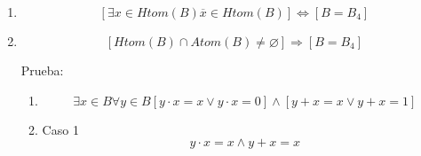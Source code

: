 \begin{enumerate}
\begin{enumerate}
\begin{enumerate}
\begin{enumerate}
        \[\vee \left\lbrack {{{\left\lbrack {x\mathsf{\mathit{maximal}}\overline{y}} \right\rbrack \land \left\lbrack {\overline{x}\mathsf{\mathit{maximal}}y} \right\rbrack} \land \left\lbrack {\neg{({x\mathsf{\mathit{maximal}}y})}} \right\rbrack} \land \left\lbrack {\neg{({\overline{x}\mathsf{\mathit{maximal}}\overline{y}})}} \right\rbrack} \right\rbrack\]
      \item
        Pongamos sin pérdida de generalidad

        \[\forall{{\{{y,\overline{y}}\}} \subset B_{\ast}^{\ast}}\]

        \[\left\lbrack {{{\left\lbrack {x\mathsf{\mathit{maximal}}y} \right\rbrack \land \left\lbrack {\overline{x}\mathsf{\mathit{maximal}}\overline{y}} \right\rbrack} \land \left\lbrack {\neg{({x\mathsf{\mathit{maximal}}\overline{y}})}} \right\rbrack} \land \left\lbrack {\neg{({\overline{x}\mathsf{\mathit{maximal}}y})}} \right\rbrack} \right\rbrack \land\]

        \[\land \left\lbrack {{{\left\lbrack {x\mathsf{\mathit{maximal}}y} \right\rbrack \land \left\lbrack {\overline{x}\mathsf{\mathit{maximal}}\overline{y}} \right\rbrack} \land \left\lbrack {\neg{({x\mathsf{\mathit{maximal}}\overline{y}})}} \right\rbrack} \land \left\lbrack {\neg{({\overline{x}\mathsf{\mathit{maximal}}y})}} \right\rbrack} \right\rbrack\]
      \item
        \[\forall{{\{{y,\overline{y}}\}} \subset B_{\ast}^{\ast}}{{{y + \overline{x}} = {{1 \land y} \cdot \overline{x}}} = 0}\]
      \item
        \[\forall{{\{{y,\overline{y}}\}} \subset B_{\ast}^{\ast}}{{y = {x \land \overline{y}}} = \overline{x}}\]
      \item
        \[{B_{\ast}^{\ast} = {{\{ 1,0\}} \cup \mathit{Htom}}}{{{(B)} = {\{{1,0,x,\overline{x}}\}}} = B_{4}}\]
      \end{enumerate}
    \item
      \[\left\lbrack {\exists{x \in \mathit{Htom}}{(B)}{\overline{x} \in \mathit{Htom}}{(B)}} \right\rbrack\Leftrightarrow\left\lbrack {B = B_{4}} \right\rbrack\]
    \item
      \[\left\lbrack {\mathit{Htom}{{(B)} \cap \mathit{Atom}}{{(B)} \neq \varnothing}} \right\rbrack\Rightarrow\left\lbrack {B = B_{4}} \right\rbrack\]

      Prueba:

      \begin{enumerate}
      \def\labelenumiv{\arabic{enumiv}.}
      \item
        \[\exists{x \in B}\forall{y \in B}{\left\lbrack {{{y \cdot x} = {x \vee {y \cdot x}}} = 0} \right\rbrack \land \left\lbrack {{{y + x} = {{x \vee y} + x}} = 1} \right\rbrack}\]
      \item
        Caso 1 \[{{y \cdot x} = {{x \land y} + x}} = x\]


\end{enumerate}
\end{enumerate}
\end{enumerate}
\end{enumerate}
